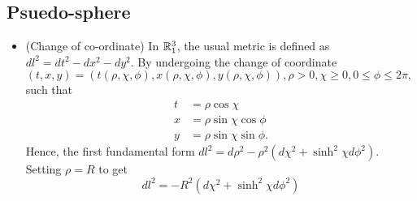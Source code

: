 \subsection{Psuedo-sphere}
\begin{itemize}
	\item (Change of co-ordinate)
	In $\mathbb{R}^3_1$, the usual metric is defined as $dl^2 = dt^2 - dx^2 - dy^2$. By undergoing the change of coordinate $(t, x, y) = (t(\rho, \chi, \phi), x(\rho, \chi, \phi), y(\rho, \chi, \phi)), \rho > 0, \chi \geq 0, 0 \leq \phi \leq 2\pi,$ such that
	\begin{align}
	t &= \rho \cos\chi \\
	x &= \rho \sin\chi \cos\phi \\
	y &= \rho \sin\chi \sin\phi.
	\end{align}
	Hence, the first fundamental form $dl^2 = d\rho^2 - \rho^2(d\chi^2 + \sinh^2\chi d\phi^2)$. Setting $\rho = R$ to get
	\begin{equation}
		dl^2 = - R^2(d\chi^2 + \sinh^2\chi d\phi^2)
	\end{equation}
\end{itemize}
